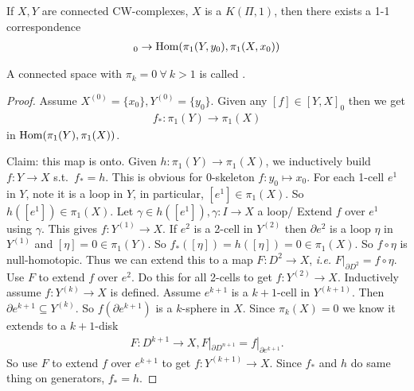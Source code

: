 \documentclass[12pt,class=article,crop=false]{standalone}
\begin{document}
\begin{thm}
If $ X,Y$ are connected  CW-complexes, $ X$ is a  $ K(\Pi,1)$, then there exists a 1-1 correspondence
\begin{align*}
	[(Y,y_0),(X,x_0)]_0 \to \Hom( \pi_1(Y,y_0), \pi_1(X,x_0))
\end{align*}
\end{thm}
\begin{defn}
A connected space with $ \pi_k=0 \ \forall \ k>1$ is called . 
\end{defn}

\begin{proof}
	Assume $ X^{(0)} = \{x_0\}, Y^{(0)}= \{y_0\}  $. Given any $ [f] \in [Y, X]_0$ then we get
	\begin{align*}
		f_*: \pi_1(Y) \to \pi_1(X)
	\end{align*}
	in $ \operatorname{Hom}( \pi_1(Y), \pi_1(X))$. 

	Claim: this map is onto. Given $ h: \pi_1(Y) \to \pi_1(X)$, we inductively build $ f:Y \to X$ s.t.\ $ f_*=h$. This is obvious for 0-skeleton  $ f:y_0 \mapsto x_0$. For each 1-cell $ e^{1}$ in $ Y$, note it is a loop in  $ Y$, in particular,  $ [e^{1}] \in \pi_1(X)$. So $ h([e^{1}]) \in \pi_1(X)$. Let $ \gamma \in h([e^{1}]), \gamma:I \to X$ a loop/ Extend $ f$ over  $ e^{1}$ using $ \gamma$. This gives $ f:Y^{(1)} \to X$. If $ e ^2$ is a 2-cell in $ Y^{(2)}$ then $ \partial e ^2$ is a loop $ \eta$ in $ Y^{(1)}$ and $ [\eta] = 0 \in \pi_1(Y)$. So $ f_*([\eta]) = h([\eta]) = 0 \in \pi_1(X)$. So $ f \circ \eta$ is null-homotopic. Thus we can extend this to a map $ F: D^2 \to X$, \emph{i.e.} $ F|_{\partial D^2} = f \circ \eta$. Use $ F$ to extend  $ f$ over  $ e ^2$. Do this for all 2-cells to get $ f:Y^{(2)} \to X$. Inductively assume $ f:Y^{(k)} \to X$ is defined. Assume $ e^{k+1}$ is a $ k+1$-cell in  $ Y^{(k+1)}$. Then $ \partial e^{k+1}  \subseteq Y^{(k)}$. So $ f(\partial e^{k+1})$ is a $ k$-sphere in  $ X$. Since  $ \pi_k(X) = 0$ we know it extends to a $ k+1$-disk
	 \begin{align*}
		F: D^{k+1} \to X, F|_{\partial D^{n+1}} = f|_{\partial e^{k+1}}.
	\end{align*}
	So use $ F$ to extend  $ f$ over  $ e^{k+1}$ to get $ f:Y^{(k+1)} \to X$. Since $ f_*$ and  $ h$ do same thing on generators,  $ f_* = h$.


\end{proof}
\end{document}
